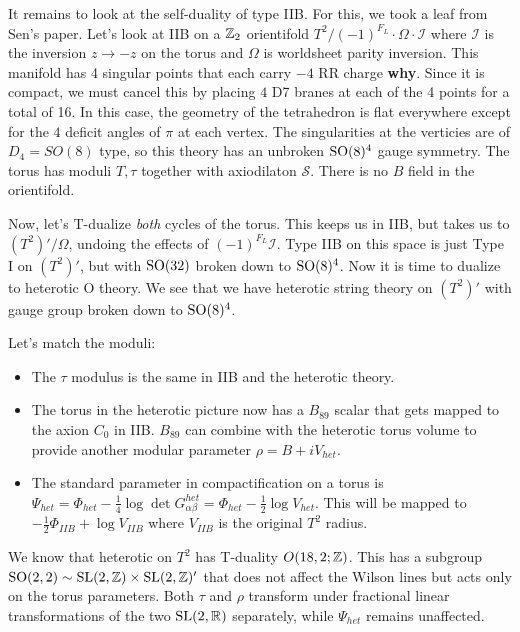 \documentclass[11pt, class=article, crop=false]{standalone}
\begin{document}
\begin{enumerate}
	It remains to look at the self-duality of type IIB. For this, we took a leaf from Sen's paper. Let's look at IIB on a $\mathbb{Z}_2$ orientifold $T^2/(-1)^{F_L} \cdot \Omega \cdot \mathcal I$ where $\mathcal I$ is the inversion $z \to -z$ on the torus and $\Omega$ is worldsheet parity inversion. This manifold has 4 singular points that each carry $-4$ RR charge \textbf{why}. Since it is compact, we must cancel this by placing $4$ D7 branes at each of the 4 points for a total of 16. In this case, the geometry of the tetrahedron is flat everywhere except for the $4$ deficit angles of $\pi$ at each vertex. The singularities at the verticies are of $D_4 = SO(8)$ type, so this theory has an unbroken $\mathrm{SO}(8)^4$ gauge symmetry. The torus has moduli $T, \tau$ together with axiodilaton $\mathcal S$. There is no $B$ field in the orientifold.
	
	Now, let's T-dualize \emph{both} cycles of the torus. This keeps us in IIB, but takes us to $(T^2)'/\Omega$, undoing the effects of $(-1)^{F_L} \mathcal I$. Type IIB on this space is just Type I on $(T^2)'$, but with $\mathrm{SO}(32)$ broken down to $\mathrm{SO}(8)^4$. Now it is time to dualize to heterotic O theory. We see that we have heterotic string theory on $(T^2)'$ with gauge group broken down to $\mathrm{SO}(8)^4$. 
	
	Let's match the moduli: 
	\begin{itemize}
		\item The $\tau$ modulus is the same in IIB and the heterotic theory.
		\item The torus in the heterotic picture now has a $B_{89}$ scalar that gets mapped to the axion $C_0$ in IIB. $B_{89}$ can combine with the heterotic torus volume to provide another modular parameter $\rho = B + i V_{het}$. 
		\item The standard parameter in compactification on a torus is $\Psi_{het} = \Phi_{het} - \frac14 \log \det G_{\alpha \beta}^{het} = \Phi_{het} - \frac12 \log V_{het}$. This will be mapped to $-\frac12 \Phi_{IIB} + \log V_{IIB}$ where $V_{IIB}$ is the original $T^2$ radius. 
	\end{itemize} 
	
	We know that heterotic on $T^2$ has T-duality $O(18, 2; \mathbb{Z})$. This has a subgroup $\mathrm{SO}(2,2) \sim \mathrm{SL}(2, \mathbb{Z}) \times \mathrm{SL}(2, \mathbb{Z})'$ that does not affect the Wilson lines but acts only on the torus parameters. Both $\tau$ and $\rho$ transform under fractional linear transformations of the two $\mathrm{SL}(2, \mathbb{R})$ separately, while $\Psi_{het}$ remains unaffected.
	

\end{enumerate}
\end{document}
